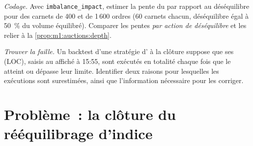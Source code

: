\begin{exercise}[$\star\star\star$]\label{exo:m1:auctions:7}
\emph{Codage.} Avec \texttt{imbalance\_impact}, estimer la pente du 
par rapport au déséquilibre pour des carnets de 400 et de 1\,600 ordres (60 carnets
chacun, déséquilibre égal à 50~\% du volume équilibré). Comparer les pentes
\emph{par action de déséquilibre} et les relier à la
\cref{prop:m1:auctions:depth}.
\end{exercise}

\begin{exercise}[$\star\star\star$]\label{exo:m1:auctions:8}
\emph{Trouver la faille.} Un backtest d'une stratégie d' à la clôture suppose que
ses  (LOC), saisis au  affiché à 15:55,
sont exécutés en totalité chaque fois que le  atteint ou dépasse leur limite.
Identifier deux raisons pour lesquelles les exécutions sont surestimées, ainsi que
l'information nécessaire pour les corriger.
\end{exercise}

\section{Problème~: la clôture du rééquilibrage d'indice}

